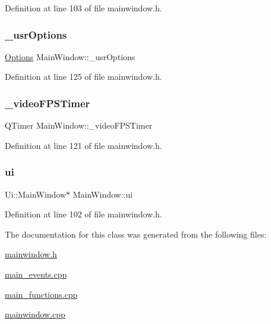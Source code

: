 Definition at line 103 of file mainwindow.\+h.

\mbox{\label{class_main_window_a0f1a92e35aed746b3e7666e7d62b8605}} 
\subsubsection{\texorpdfstring{\_usrOptions}{\_usrOptions}}
{\footnotesize\ttfamily \mbox{\hyperlink{struct_options}{Options}} Main\+Window\+::\+\_\+usr\+Options\hspace{0.3cm}{\ttfamily [private]}}



Definition at line 125 of file mainwindow.\+h.

\mbox{\label{class_main_window_a13da2145ec632c79dd1c61ec1bd7a792}} 
\subsubsection{\texorpdfstring{\_videoFPSTimer}{\_videoFPSTimer}}
{\footnotesize\ttfamily Q\+Timer Main\+Window\+::\+\_\+video\+F\+P\+S\+Timer\hspace{0.3cm}{\ttfamily [private]}}



Definition at line 121 of file mainwindow.\+h.

\mbox{\label{class_main_window_a35466a70ed47252a0191168126a352a5}} 
\subsubsection{\texorpdfstring{ui}{ui}}
{\footnotesize\ttfamily Ui\+::\+Main\+Window$\ast$ Main\+Window\+::ui\hspace{0.3cm}{\ttfamily [private]}}



Definition at line 102 of file mainwindow.\+h.



The documentation for this class was generated from the following files\+:\begin{DoxyCompactItemize}
\item 
\mbox{\hyperlink{mainwindow_8h}{mainwindow.\+h}}\item 
\mbox{\hyperlink{main__events_8cpp}{main\+\_\+events.\+cpp}}\item 
\mbox{\hyperlink{main__functions_8cpp}{main\+\_\+functions.\+cpp}}\item 
\mbox{\hyperlink{mainwindow_8cpp}{mainwindow.\+cpp}}\end{DoxyCompactItemize}

